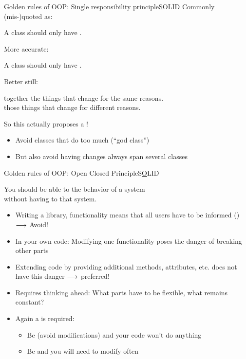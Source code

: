 \begin{frame}{Golden rules of OOP: Single responsibility principle}{\underline SOLID}
	Commonly (mis-)quoted as:
	
	\begin{center}
		A class should only have .
	\end{center}

	More accurate:
	
	\begin{center}
		A class should only have .
	\end{center}

	Better still:
	\begin{center}
		 together the things that change for the same reasons. \\
		 those things that change for different reasons.
	\end{center}

	So this actually proposes a !
	\begin{itemize}
		\item Avoid classes that do too much (\enquote{god class})
		\item But also avoid having changes always span several classes
	\end{itemize}
\end{frame}

\begin{frame}{Golden rules of OOP: Open Closed Principle}{S\underline  OLID}
	\begin{center}
		You should be able to  the behavior of a system\\
		without having to  that system.
	\end{center}

	\begin{itemize}
		\item Writing a library,  functionality means that all users have to be informed () $\longrightarrow$ Avoid!
		\item In your own code: Modifying one functionality  poses the danger of breaking other parts 
		\item Extending code by providing additional methods, attributes, etc. does not have this danger $\longrightarrow$ preferred!
		\item Requires thinking ahead: What parts have to be flexible, what remains constant?
		\item Again a  is required:
		\begin{itemize}
			\item Be  (avoid modifications) and your code won't do anything
			\item Be  and you will need to modify  often
		\end{itemize}
	\end{itemize}
\end{frame}

